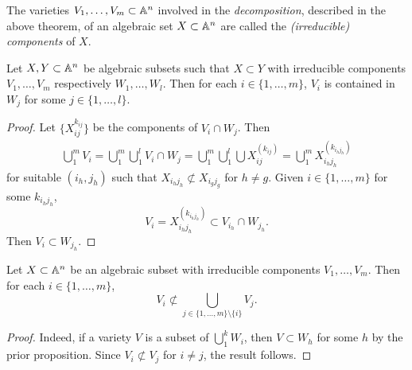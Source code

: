 \begin{definition}
    The varieties $V_1,\dots,V_m\subset \mathbb{A}^n$ involved in the \textit{decomposition}, described in the above theorem, of an algebraic set $X\subset \mathbb{A}^n$ are called the \textit{(irreducible) components} of $X$.     
\end{definition}
\begin{proposition}\label{IrreducibleComponentsContainedInIrreducibleComponentsOfSuperset} Let $X,Y\subset \mathbb{A}^n$ be algebraic subsets such that $X\subset Y$ with irreducible components $V_1,\dots,V_m$ respectively $W_1,\dots,W_l$. Then for each $i\in\{1,\dots,m\}$, $V_i$ is contained in $W_j$ for some $j\in\{1,\dots,l\}$. 
\end{proposition}
\begin{proof}
    Let $\{X_{ij}^{k_{ij}}\}$ be the components of $V_i\cap W_j$. Then 
   \begin{align*}
        \bigcup_1^m V_i = \bigcup_1^m\bigcup_1^l V_i\cap W_j= \bigcup_1^m \bigcup_1^l\bigcup X_{ij}^{(k_{ij})} = \bigcup_1^m X_{i_hj_h}^{(k_{i_hj_h})}
   \end{align*}
   for suitable $(i_h,j_h)$ such that $X_{i_hj_h}\not\subset X_{i_gj_g}$ for $h\neq g$. Given $i\in\{1,\dots,m\}$ for some $k_{i_hj_h}$,
    $$
        V_{i}=X_{i_hj_h}^{(k_{i_hj_h})}\subset V_{i_h}\cap W_{j_h}.   
    $$
    Then $V_i\subset W_{j_h}$.

\end{proof}
\begin{proposition}
    Let $X\subset \mathbb{A}^n$ be an algebraic subset with irreducible components $V_1,\dots,V_m$. Then for each $i\in \{1,\dots,m\}$, 
    $$V_i \not\subset \bigcup_{j\in\{1,\dots,m\}\setminus\{i\}} V_j.$$
\end{proposition}
\begin{proof}
    Indeed, if a variety $V$ is a subset of $\bigcup_{1}^k W_i$, then $V\subset W_h$ for some $h$ by the prior proposition. Since $V_i\not\subset V_j$ for $i\neq j$, the result follows.    
\end{proof}

